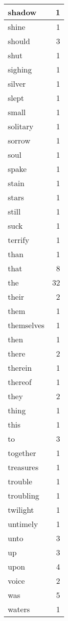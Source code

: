 \begin{center}
\begin{longtable}{l|r}
shadow & 1\\ \hline 
shine & 1\\ \hline 
should & 3\\ \hline 
shut & 1\\ \hline 
sighing & 1\\ \hline 
silver & 1\\ \hline 
slept & 1\\ \hline 
small & 1\\ \hline 
solitary & 1\\ \hline 
sorrow & 1\\ \hline 
soul & 1\\ \hline 
spake & 1\\ \hline 
stain & 1\\ \hline 
stars & 1\\ \hline 
still & 1\\ \hline 
suck & 1\\ \hline 
terrify & 1\\ \hline 
than & 1\\ \hline 
that & 8\\ \hline 
the & 32\\ \hline 
their & 2\\ \hline 
them & 1\\ \hline 
themselves & 1\\ \hline 
then & 1\\ \hline 
there & 2\\ \hline 
therein & 1\\ \hline 
thereof & 1\\ \hline 
they & 2\\ \hline 
thing & 1\\ \hline 
this & 1\\ \hline 
to & 3\\ \hline 
together & 1\\ \hline 
treasures & 1\\ \hline 
trouble & 1\\ \hline 
troubling & 1\\ \hline 
twilight & 1\\ \hline 
untimely & 1\\ \hline 
unto & 3\\ \hline 
up & 3\\ \hline 
upon & 4\\ \hline 
voice & 2\\ \hline 
was & 5\\ \hline 
waters & 1\\ \hline 

\end{longtable}
\end{center}
